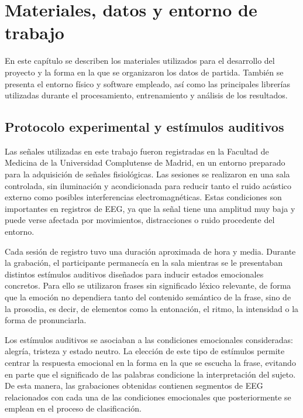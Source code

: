 
\chapter{Materiales, datos y entorno de trabajo}
\label{cap:capitulo4}

En este capítulo se describen los materiales utilizados para el desarrollo del proyecto y la forma en la que se organizaron los datos de partida. También se presenta el entorno físico y software empleado, así como las principales librerías utilizadas durante el procesamiento, entrenamiento y análisis de los resultados.


\section{Protocolo experimental y estímulos auditivos}

Las señales utilizadas en este trabajo fueron registradas en la Facultad de Medicina de la Universidad Complutense de Madrid, en un entorno preparado para la adquisición de señales fisiológicas. Las sesiones se realizaron en una sala controlada, sin iluminación y acondicionada para reducir tanto el ruido acústico externo como posibles interferencias electromagnéticas. Estas condiciones son importantes en registros de \ac{EEG}, ya que la señal tiene una amplitud muy baja y puede verse afectada por movimientos, distracciones o ruido procedente del entorno.

Cada sesión de registro tuvo una duración aproximada de hora y media. Durante la grabación, el participante permanecía en la sala mientras se le presentaban distintos estímulos auditivos diseñados para inducir estados emocionales concretos. Para ello se utilizaron frases sin significado léxico relevante, de forma que la emoción no dependiera tanto del contenido semántico de la frase, sino de la prosodia, es decir, de elementos como la entonación, el ritmo, la intensidad o la forma de pronunciarla.

Los estímulos auditivos se asociaban a las condiciones emocionales consideradas: alegría, tristeza y estado neutro. La elección de este tipo de estímulos permite centrar la respuesta emocional en la forma en la que se escucha la frase, evitando en parte que el significado de las palabras condicione la interpretación del sujeto. De esta manera, las grabaciones obtenidas contienen segmentos de \ac{EEG} relacionados con cada una de las condiciones emocionales que posteriormente se emplean en el proceso de clasificación.

